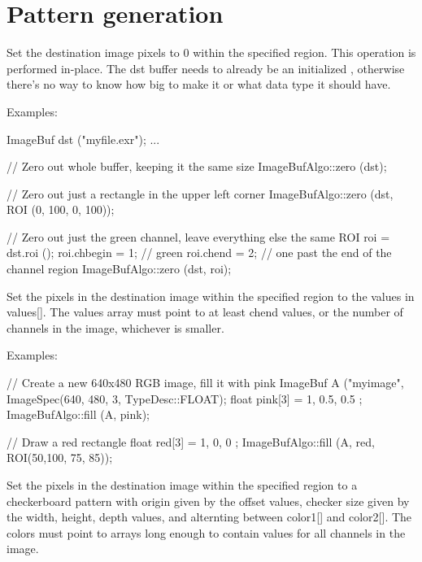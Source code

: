 \section{Pattern generation}
\label{sec:iba:patterns}

 
Set the destination image pixels to 0 within the specified region.
This operation is performed in-place.  The {\cf dst} buffer needs to
already be an initialized \ImageBuf, otherwise there's no way to know how
big to make it or what data type it should have.

\smallskip
\noindent Examples:
\begin{code}
    ImageBuf dst ("myfile.exr");
    ...

    // Zero out whole buffer, keeping it the same size
    ImageBufAlgo::zero (dst);

    // Zero out just a rectangle in the upper left corner
    ImageBufAlgo::zero (dst, ROI (0, 100, 0, 100));

    // Zero out just the green channel, leave everything else the same
    ROI roi = dst.roi ();
    roi.chbegin = 1; // green
    roi.chend = 2;   // one past the end of the channel region
    ImageBufAlgo::zero (dst, roi);
\end{code}
\apiend

 
Set the pixels in the destination image within the specified region
to the values in {\cf values[]}.  The {\cf
  values} array must point to at least {\cf chend} values, or the
number of channels in the image, whichever is smaller.

\smallskip
\noindent Examples:
\begin{code}
    // Create a new 640x480 RGB image, fill it with pink
    ImageBuf A ("myimage", ImageSpec(640, 480, 3, TypeDesc::FLOAT);
    float pink[3] = { 1, 0.5, 0.5 };
    ImageBufAlgo::fill (A, pink);

    // Draw a red rectangle
    float red[3] = { 1, 0, 0 };
    ImageBufAlgo::fill (A, red, ROI(50,100, 75, 85));
\end{code}
\apiend


 
Set the pixels in the destination image within the specified region
to a checkerboard pattern with origin given by the {\cf offset} values,
checker size given by the {\cf width, height, depth} values, and 
alternting between {\cf color1[]} and {\cf color2[]}.  The colors must
point to arrays long enough to contain values for all channels in the
image.

